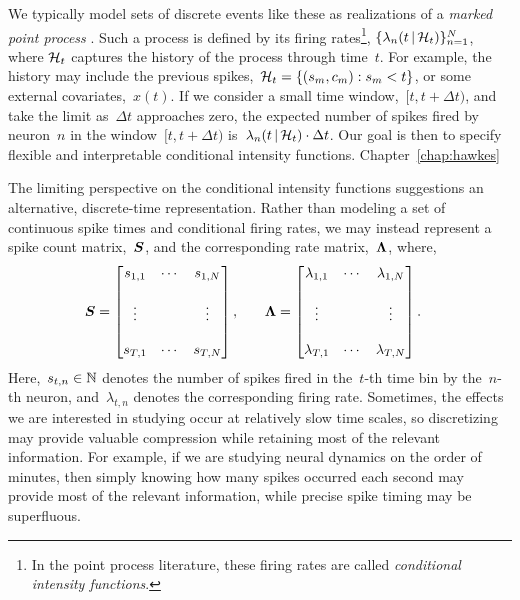 We typically model sets of discrete events like these as realizations
of a \emph{marked point process} \cite{daley2003introduction1}. Such a
process is defined by its firing rates\footnote{In the point process
  literature, these firing rates are called \emph{conditional
    intensity functions}.},
${\{\lambda_n(t \,|\, \mathcal{H}_t)\}_{n=1}^N}$, where $\mathcal{H}_t$ captures
the history of the process through time~$t$. For example, the history
may include the previous spikes,~${\mathcal{H}_t = \{(s_m, c_m): s_m < t\}}$,
or some external covariates,~$x(t)$.  If we consider a small time
window,~${[t, t+\Delta t)}$, and take the limit as~$\Delta t$
approaches zero, the expected number of spikes fired by neuron~$n$ in
the window~${[t, t+\Delta t)}$
is~${\lambda_n(t \,|\, \mathcal{H}_t) \cdot \Delta t}$. Our
goal is then to specify flexible and interpretable conditional intensity
functions. Chapter~\ref{chap:hawkes} 

The limiting perspective on the conditional intensity functions
suggestions an alternative, discrete-time representation.  Rather than
modeling a set of continuous spike times and conditional firing rates,
we may instead represent a spike count matrix,~$\boldsymbol{S}$, and the
corresponding rate matrix,~$\boldsymbol{\Lambda}$, where,
\begin{align}
  \boldsymbol{S} &= 
        \begin{bmatrix}
          s_{1,1} & \cdots & s_{1,N} \\
          & & \\
          \vdots  &        & \vdots  \\ 
          & & \\
          s_{T,1} & \cdots & s_{T,N}
        \end{bmatrix}, 
  & & &
  \boldsymbol{\Lambda} &= 
        \begin{bmatrix}
          \lambda_{1,1} & \cdots & \lambda_{1,N} \\
          & & \\
          \vdots  &        & \vdots  \\ 
          & & \\
          \lambda_{T,1} & \cdots & \lambda_{T,N}
        \end{bmatrix}.
\end{align}
Here,~$s_{t,n} \in \mathbb{N}$ denotes the number of spikes fired in
the~$t$-th time bin by the~$n$-th neuron, and~$\lambda_{t,n}$ denotes 
the corresponding firing rate. Sometimes, the effects we
are interested in studying occur at relatively slow time scales, so
discretizing may provide valuable compression while retaining most of
the relevant information. For example, if we are studying neural
dynamics on the order of minutes, then simply knowing how many spikes
occurred each second may provide most of the relevant information, while
precise spike timing may be superfluous.

